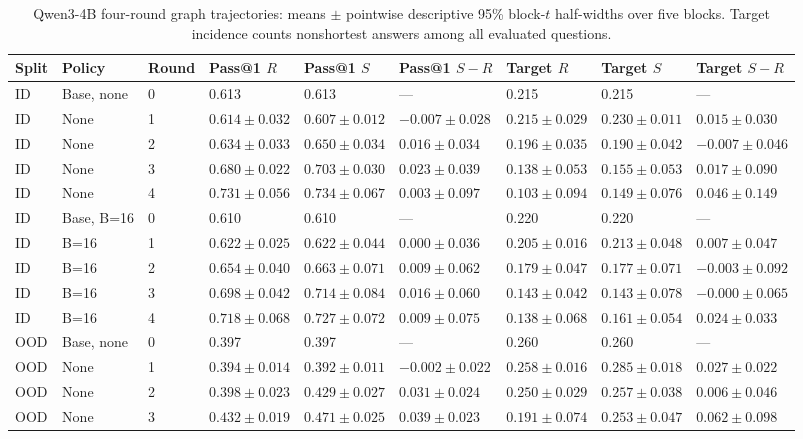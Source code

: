 \begin{table}[H]
\caption{Qwen3-4B four-round graph trajectories: means $\pm$ pointwise descriptive 95\% block-$t$ half-widths over five blocks. Target incidence counts nonshortest answers among all evaluated questions.}
\label{tab:qwen4b-rounds}
\centering\small\setlength{\tabcolsep}{3pt}
\begin{tabular}{@{}lllllllll@{}}
\toprule
Split & Policy & Round & Pass@1 $R$ & Pass@1 $S$ & Pass@1 $S-R$ & Target $R$ & Target $S$ & Target $S-R$\\
\midrule
ID & Base, none & 0 & 0.613 & 0.613 & --- & 0.215 & 0.215 & ---\\
ID & None & 1 & $0.614\pm0.032$ & $0.607\pm0.012$ & $-0.007\pm0.028$ & $0.215\pm0.029$ & $0.230\pm0.011$ & $0.015\pm0.030$\\
ID & None & 2 & $0.634\pm0.033$ & $0.650\pm0.034$ & $0.016\pm0.034$ & $0.196\pm0.035$ & $0.190\pm0.042$ & $-0.007\pm0.046$\\
ID & None & 3 & $0.680\pm0.022$ & $0.703\pm0.030$ & $0.023\pm0.039$ & $0.138\pm0.053$ & $0.155\pm0.053$ & $0.017\pm0.090$\\
ID & None & 4 & $0.731\pm0.056$ & $0.734\pm0.067$ & $0.003\pm0.097$ & $0.103\pm0.094$ & $0.149\pm0.076$ & $0.046\pm0.149$\\
ID & Base, B=16 & 0 & 0.610 & 0.610 & --- & 0.220 & 0.220 & ---\\
ID & B=16 & 1 & $0.622\pm0.025$ & $0.622\pm0.044$ & $0.000\pm0.036$ & $0.205\pm0.016$ & $0.213\pm0.048$ & $0.007\pm0.047$\\
ID & B=16 & 2 & $0.654\pm0.040$ & $0.663\pm0.071$ & $0.009\pm0.062$ & $0.179\pm0.047$ & $0.177\pm0.071$ & $-0.003\pm0.092$\\
ID & B=16 & 3 & $0.698\pm0.042$ & $0.714\pm0.084$ & $0.016\pm0.060$ & $0.143\pm0.042$ & $0.143\pm0.078$ & $-0.000\pm0.065$\\
ID & B=16 & 4 & $0.718\pm0.068$ & $0.727\pm0.072$ & $0.009\pm0.075$ & $0.138\pm0.068$ & $0.161\pm0.054$ & $0.024\pm0.033$\\
OOD & Base, none & 0 & 0.397 & 0.397 & --- & 0.260 & 0.260 & ---\\
OOD & None & 1 & $0.394\pm0.014$ & $0.392\pm0.011$ & $-0.002\pm0.022$ & $0.258\pm0.016$ & $0.285\pm0.018$ & $0.027\pm0.022$\\
OOD & None & 2 & $0.398\pm0.023$ & $0.429\pm0.027$ & $0.031\pm0.024$ & $0.250\pm0.029$ & $0.257\pm0.038$ & $0.006\pm0.046$\\
OOD & None & 3 & $0.432\pm0.019$ & $0.471\pm0.025$ & $0.039\pm0.023$ & $0.191\pm0.074$ & $0.253\pm0.047$ & $0.062\pm0.098$\\

\end{tabular}
\end{table}
